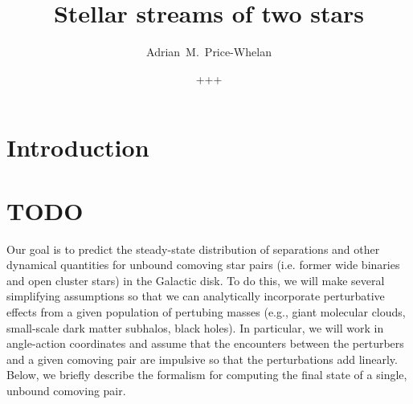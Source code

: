 \documentclass[modern, letterpaper]{aastex61}
\begin{document}
\sloppy\sloppypar\raggedbottom\frenchspacing %

\title{Stellar streams of two stars}

\author{Adrian~M.~Price-Whelan}

\author{+++}



\begin{abstract}
\end{abstract}

\keywords{
}

\section{Introduction}\label{sec:introduction}


\section{TODO} %

Our goal is to predict the steady-state distribution of separations and other
dynamical quantities for unbound comoving star pairs (i.e. former wide binaries
and open cluster stars) in the Galactic disk.
To do this, we will make several simplifying assumptions so that we can
analytically incorporate perturbative effects from a given population of
pertubing masses (e.g., giant molecular clouds, small-scale dark matter
subhalos, black holes).
In particular, we will work in angle-action coordinates and assume that the
encounters between the perturbers and a given comoving pair are impulsive so
that the perturbations add linearly.
Below, we briefly describe the formalism for computing the final state of a
single, unbound comoving pair.
\end{document}

